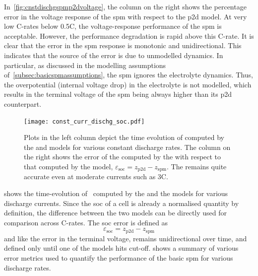 In~\cref{fig:cnstdischgspmp2dvoltage},  the  column  on   the  right  shows  the
percentage error  in the voltage response  of the \gls{spm} with  respect to the
\gls{p2d} model.  At very  low C-rates  below \approx0.5C,  the voltage-response
performance of the \gls{spm} is acceptable. However, the performance degradation
is rapid above this C-rate. It is clear that the error in the \gls{spm} response
is monotonic and unidirectional. This indicates  that the source of the error is
due  to  unmodelled dynamics.  In  particular,  as  discussed in  the  modelling
assumptions  of~\cref{subsec:basicspmassumptions},  the  \gls{spm}  ignores  the
electrolyte dynamics.  Thus, the  overpotential (internal  voltage drop)  in the
electrolyte  is not  modelled,  which results  in the  terminal  voltage of  the
\gls{spm} being always higher than its \gls{p2d} counterpart.

\begin{figure}[!htb]
    \centering
    \texttt{[image: const\_curr\_dischg\_soc.pdf]}
    \caption[ computed by  and
     models for constant current discharge]{Plots in the left
        column depict the time evolution of  computed by the
         and  models for various constant
        discharge rates. The column on the right shows the error of the
         computed by the  with respect to that
        computed by the  model, \ie{} $ \varepsilon_\text{soc}
        = {z_\text{p2d}} - z_\text{spm} $. The  remains quite
    accurate even at moderate currents such as 3C.}
    \label{fig:cnstdischgspmp2dsoc}
\end{figure}

  shows  the  time-evolution  of~
computed by the   and the   models for various
discharge  currents. Since  the  \gls{soc} of  a cell  is  already a  normalised
quantity by  definition, the difference between  the two models can  be directly
used for comparison across C-rates. The \gls{soc} error is defined as
\begin{equation}
    \varepsilon_\text{soc} = {z_\text{p2d}} - z_\text{spm}
\end{equation}
and   like  the   error  in   the  terminal   voltage,  remains   unidirectional
over  time,   and  defined  only   until  one   of  the  models   hits  cut-off.
  shows  a  summary of  various  error
metrics used  to quantify  the performance  of the  basic \gls{spm}  for various
discharge rates.

